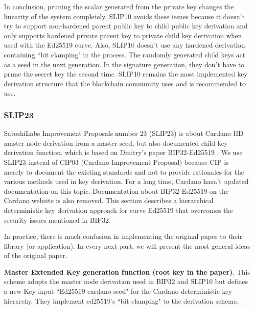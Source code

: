 \begin{adjustwidth}{1cm}{}
\begin{itemize}
\begin{quote}
              \end{quote}

    \end{itemize}
    In conclusion, pruning the scalar generated from the private key changes the linearity of the system completely. SLIP10 avoids these issues because it doesn't try to support non-hardened parent public key to child public key derivation and only supports hardened private parent key to private child key derivation when used with the Ed25519 curve. Also, SLIP10 doesn't use any hardened derivation containing ``bit clamping" in the process. The randomly generated child keys act as a seed in the next generation. In the signature generation, they don't have to prune the secret key the second time. SLIP10 remains the most implemented key derivation structure that the blockchain community uses and is recommended to use.

\end{adjustwidth}


\subsubsection{SLIP23}
\label{bip32ed25519}

SatoshiLabs Improvement Proposals number 23 (SLIP23) is about Cardano HD master node derivation from a master seed, but also documented child key derivation function, which is based on Dmitry’s paper BIP32-Ed25519 \cite{Khovratovich2017}. We use SLIP23 instead of CIP03 (Cardano Improvement Proposal) because CIP is merely to document the existing standards and not to provide rationales for the various methods used in key derivation. For a long time, Cardano hasn’t updated documentation on this topic. Documentation about BIP32-Ed25519 on the Cardano website is also removed. This section describes a hierarchical deterministic key derivation approach for curve Ed25519 that overcomes the security issues mentioned in BIP32.

In practice, there is much confusion in implementing the original paper to their library (or application). In every next part, we will present the most general ideas of the original paper.

\bigskip
{\textbf{Master Extended Key generation function (root key in the paper)}}. This scheme adopts the master node derivation used in BIP32 and SLIP10 but defines a new Key input ``Ed25519 cardano seed" for the Cardano deterministic key hierarchy. They implement ed25519's ``bit clamping" to the derivation schema.

